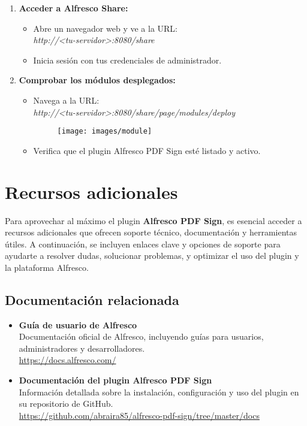 \documentclass{template/ol-softwaremanual.cls}
\begin{document}
\begin{enumerate}
	\item \textbf{Acceder a Alfresco Share:}
	\begin{itemize}
	 	\item Abre un navegador web y ve a la URL: \\ \textit{http://<tu-servidor>:8080/share}
	 	\item Inicia sesión con tus credenciales de administrador.
	\end{itemize}
	\item \textbf{Comprobar los módulos desplegados:}
	\begin{itemize}
		\item Navega a la URL: \\ \textit{http://<tu-servidor>:8080/share/page/modules/deploy}
		\begin{figure}[h]
			\centering
			\texttt{[image: images/module]}
			\label{fig:etiqueta_imagen}
		\end{figure}
		\item Verifica que el plugin Alfresco PDF Sign esté listado y activo.
	\end{itemize}
\end{enumerate}

\section{Recursos adicionales}

Para aprovechar al máximo el plugin \textbf{Alfresco PDF Sign}, es esencial acceder a recursos adicionales que ofrecen soporte técnico, documentación y herramientas útiles. A continuación, se incluyen enlaces clave y opciones de soporte para ayudarte a resolver dudas, solucionar problemas, y optimizar el uso del plugin y la plataforma Alfresco.

\subsection{Documentación relacionada}

\begin{itemize}
	\item \textbf{Guía de usuario de Alfresco}\\
	Documentación oficial de Alfresco, incluyendo guías para usuarios, administradores y desarrolladores.\\
	\url{https://docs.alfresco.com/}

	\item \textbf{Documentación del plugin Alfresco PDF Sign}\\
	Información detallada sobre la instalación, configuración y uso del plugin en su repositorio de GitHub.\\
	\url{https://github.com/abraira85/alfresco-pdf-sign/tree/master/docs}
\end{itemize}
\end{document}
